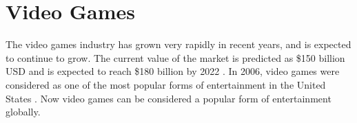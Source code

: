 \documentclass[a4paper,11.5pt]{report}
\numberwithin{figure}{section}
\numberwithin{table}{section}
\numberwithin{equation}{section}
\numberwithin{equation}{section}
\begin{document}




\section{Video Games}




The video games industry has grown very rapidly in recent years, and is expected to continue to grow. The current value of the market is predicted as \$150 billion USD and is expected to reach \$180 billion by 2022 \citep{vgamesResearch}. In 2006, video games were considered as one of the most popular forms of entertainment in the United States \citep{sherry2006, ritterfeld2006}. Now video games can be considered a popular form of entertainment globally.

\end{document}
